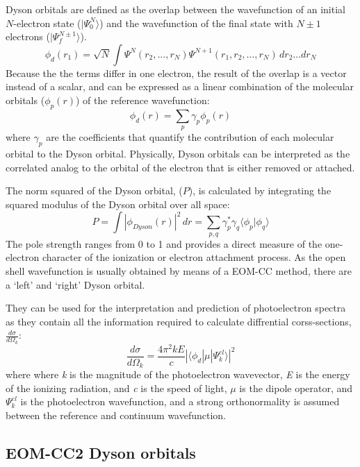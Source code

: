 Dyson orbitals are defined as the overlap between the wavefunction of an initial $N$-electron state ($|\Psi_0^N\rangle$) and the wavefunction of the final state with $N\pm1$ electrons ($|\Psi_f^{N\pm1}\rangle$).
\begin{equation}
    \phi_{d}(r_1) = \sqrt{N} \int \Psi^{N}(r_2,\dots,r_N) \Psi^{N+1}(r_1, r_2,\dots,r_N)\,dr_2 \dots dr_N
\end{equation}
Because the the terms differ in one electron, the result of the overlap is a vector instead of a scalar, and can be expressed as a linear combination of the molecular orbitals ($\phi_p(r)$) of the reference wavefunction:
\begin{equation}
    \phi_{d}(r) = \sum_p \gamma_p \phi_p(r)
\end{equation}
where $\gamma_p$ are the coefficients that quantify the contribution of each molecular orbital to the Dyson orbital. Physically, Dyson orbitals can be interpreted as the correlated analog to the orbital of the electron that is either removed or attached.

The norm squared of the Dyson orbital, ($P$), is calculated by integrating the squared modulus of the Dyson orbital over all space:
\begin{equation}
    P = \int |\phi_{Dyson}(r)|^2 \,dr = \sum_{p,q} \gamma_p^* \gamma_q \langle \phi_p | \phi_q \rangle
\end{equation}
The pole strength ranges from 0 to 1 and provides a direct measure of the one-electron character of the ionization or electron attachment process. As the open shell wavefunction is usually obtained by means of a EOM-CC method, there are a `left' and `right' Dyson orbital.


They can be used for the interpretation and prediction of photoelectron spectra as they contain all the information required to calculate diffrential corss-sections, $\frac{d\sigma}{d\Omega_k}$:
\begin{equation}
    \frac{d\sigma}{d\Omega_k} = \frac{4\pi^2kE}{c}|\langle \phi_d | \mu | \Psi^{el}_k \rangle |^2
\end{equation}
where where \textit{k} is the magnitude of the photoelectron wavevector, \textit{E} is the energy of the ionizing radiation, and \textit{c} is the speed of light, $\mu$ is the dipole operator, and $\Psi^{el}_k$ is the photoelectron wavefunction, and a strong orthonormality is assumed between the reference and continuum wavefunction.  

\subsection{EOM-CC2 Dyson orbitals}

\cleardoublepage

